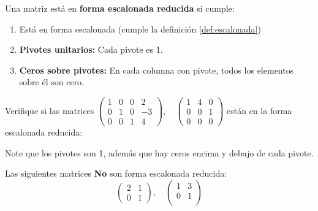 \begin{definition}\label{def:escalonada-reducida}
Una matriz está en \textbf{forma escalonada reducida} si cumple:
\begin{enumerate}
\item Está en forma escalonada (cumple la definición \ref{def:escalonada})
\item \textbf{Pivotes unitarios:} Cada pivote es 1.
\item \textbf{Ceros sobre pivotes:} En cada columna con pivote, todos los elementos sobre él son cero.
\end{enumerate}
\end{definition}

\begin{example} Verifique si las matrices \(
\begin{pmatrix}
\boxed{1} & 0 & 0 & 2 \\
0 & \boxed{1} & 0 & -3 \\
0 & 0 & \boxed{1} & 4 
\end{pmatrix}, \quad
\begin{pmatrix}
\boxed{1} & 4 & 0 \\
0 & 0 & \boxed{1} \\
0 & 0 & 0 
\end{pmatrix}
\) están en la forma escalonada reducida:


\begin{myproof} Note que los pivotes son 1, además que hay ceros encima y debajo de cada pivote. \end{myproof}
\end{example}

\begin{example} Las siguientes matrices \textbf{No} son forma escalonada reducida:
\[
\begin{pmatrix}
\boxed{2} & 1 \\  %
0 & \boxed{1}
\end{pmatrix}, \quad
\begin{pmatrix}
\boxed{1} & 3 \\
0 & \boxed{1} \\  %
\end{pmatrix}\]
\end{example}

